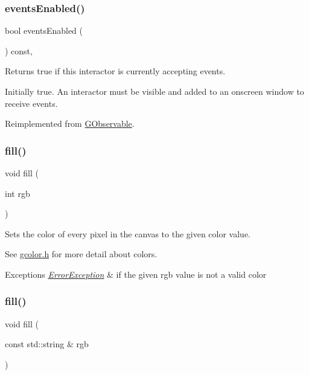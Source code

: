 \subsubsection{\texorpdfstring{events\+Enabled()}{eventsEnabled()}}
{\footnotesize\ttfamily bool events\+Enabled (\begin{DoxyParamCaption}{ }\end{DoxyParamCaption}) const\hspace{0.3cm}{\ttfamily [virtual]}, {\ttfamily [inherited]}}



Returns true if this interactor is currently accepting events. 

Initially true. An interactor must be visible and added to an onscreen window to receive events. 

Reimplemented from \mbox{\hyperlink{classGObservable_a8ebb3da91032e7f4c34485dabc518b8a}{G\+Observable}}.

\mbox{\label{classGCanvas_acaf90d64e4fea8f776e722976aeb5070}} 
\subsubsection{\texorpdfstring{fill()}{fill()}\hspace{0.1cm}{\footnotesize\ttfamily [1/2]}}
{\footnotesize\ttfamily void fill (\begin{DoxyParamCaption}\item[{int}]{rgb }\end{DoxyParamCaption})\hspace{0.3cm}{\ttfamily [virtual]}}



Sets the color of every pixel in the canvas to the given color value. 

See \mbox{\hyperlink{gcolor_8h_source}{gcolor.\+h}} for more detail about colors. 
\begin{DoxyExceptions}{Exceptions}
{\em \mbox{\hyperlink{classErrorException}{Error\+Exception}}} & if the given rgb value is not a valid color \\
\hline
\end{DoxyExceptions}
\mbox{\label{classGCanvas_a02a5aa7f1474eeedd181e6e46b5eee65}} 
\subsubsection{\texorpdfstring{fill()}{fill()}\hspace{0.1cm}{\footnotesize\ttfamily [2/2]}}
{\footnotesize\ttfamily void fill (\begin{DoxyParamCaption}\item[{const std\+::string \&}]{rgb }\end{DoxyParamCaption})\hspace{0.3cm}{\ttfamily [virtual]}}



